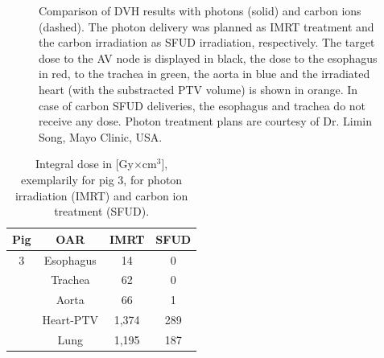 \begin{figure}
\begin{center}
{ }
 \end{center}
    \caption{Comparison of DVH results with photons (solid) and carbon ions (dashed). The photon delivery was planned as IMRT treatment 
and the carbon irradiation as SFUD irradiation, respectively. The target dose to the AV node is displayed in black, the dose to the 
esophagus in red, to the trachea in green, the aorta in blue and the irradiated heart (with the substracted PTV volume) is 
shown in orange. In case of carbon SFUD deliveries, the esophagus and trachea do not receive any dose. 
Photon treatment plans are courtesy of Dr. Limin Song, Mayo Clinic, USA.}
\label{dvh_porcine_photon_vs_carbon}
\end{figure}


\begin{table}[H]
  \centering
  \caption{Integral dose in [Gy$\times$cm$^{3}$], exemplarily for pig 3, for photon irradiation (IMRT) and carbon ion treatment (SFUD).}
  \begin{tabular}{|c|c||c|c|}
    \hline\hline
    Pig & OAR & IMRT & SFUD  \\
    \hline
    3 & Esophagus & 14 & 0 \\
    & Trachea & 62 & 0 \\
    & Aorta & 66 & 1 \\
    & Heart-PTV & 1,374 & 289 \\
    & Lung & 1,195 & 187 \\
    \hline\hline
  \end{tabular}
  \label{tab:SID:pigs}
\end{table}

\newpage

